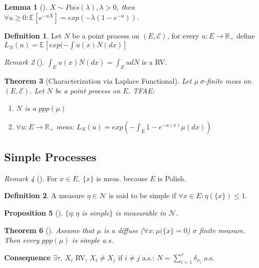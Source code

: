 \documentclass[12pt]{book}
\newtheorem{theorem}{Theorem}[section]
\newtheorem{prop}[theorem]{Proposition}
\newtheorem{lemma}[theorem]{Lemma}
\theoremstyle{definition}
\newtheorem{defn}{Definition}[section]
\theoremstyle{remark}
\newtheorem{rmk}[theorem]{Remark}
\begin{document}
\begin{lemma}[]
	$X \sim Pois(\lambda ), \lambda > 0$, then $\forall u\geq 0: \mathbb{E}_{} \left[ e^{-u X} \right] = exp( - \lambda (1 - e^{-u}))$.
\end{lemma}

\begin{defn}
	Let $N$ be a point process on $(E, \mathcal{E})$, for every $u:E\to \mathbb{R}_+$ define $L_N(u) = \mathbb{E}_{} \left[ exp(- \int u(x) N(dx) \right] $
\end{defn}

\begin{rmk}[]
	$\int_E u(x) N(dx) = \int_E u dN$ is a RV.
\end{rmk}

\begin{theorem}[Characterization via Laplace Functional]
	Let $\mu \ \sigma$-finite meas on $(E, \mathcal{E})$. Let $N$ be a point process on $E$. TFAE:
\begin{enumerate}
	\item $N$ is a $ppp(\mu)$ 
	\item $\forall u:E \to \mathbb{R}_+$ meas: $L_N(u) = exp(- \int_E 1- e^{-u(x)} \mu (dx))$
\end{enumerate}

\end{theorem}

\subsection{Simple Processes}
\begin{rmk}[]
	For $x \in E,\ \{x\}$ is meas. because $E$ is Polish.
\end{rmk}

\begin{defn}
	A measure $\eta \in \mathcal{N}$ is said to be simple if $\forall x \in E: \eta(\{x\}) \leq 1$.
\end{defn}

\begin{prop}[]
	$\{\eta: \eta$ is simple$ \}$ is measurable in $ \mathcal{N} $.
\end{prop}

\begin{theorem}[]
	Assume that $\mu $ is a diffuse ($\forall x: \mu (\{x\}=0$) $\sigma$ finite measure. Then every $ppp( \mu )$ is simple a.s.
\end{theorem}

\textbf{Consequence} $\exists \tau,\ X_i$ RV, $X_i \neq X_j$ if $i \neq j$ a.s.: $N=\sum_{i=1}^{\tau} \delta_{x_i}$ a.s.
\end{document}
